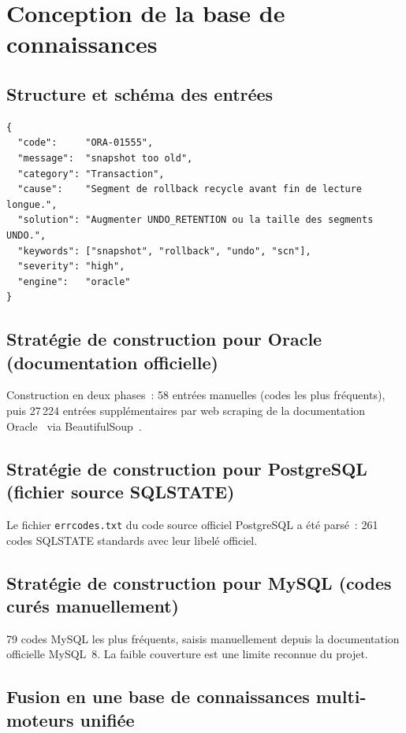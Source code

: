 \documentclass[12pt,a4paper]{report}
\begin{document}
\section{Conception de la base de connaissances}

\subsection{Structure et sch\'ema des entr\'ees}

\begin{lstlisting}[language={},caption={Sch\'ema d'une entr\'ee de la base de connaissances},label=lst:kb_schema]
{
  "code":     "ORA-01555",
  "message":  "snapshot too old",
  "category": "Transaction",
  "cause":    "Segment de rollback recycle avant fin de lecture longue.",
  "solution": "Augmenter UNDO_RETENTION ou la taille des segments UNDO.",
  "keywords": ["snapshot", "rollback", "undo", "scn"],
  "severity": "high",
  "engine":   "oracle"
}
\end{lstlisting}

\subsection{Strat\'egie de construction pour Oracle (documentation officielle)}

Construction en deux phases~: 58 entr\'ees manuelles (codes les plus fr\'equents),
puis 27\,224 entr\'ees suppl\'ementaires par web scraping de la documentation
Oracle~\cite{oracledoc} via BeautifulSoup~\cite{bs4}.

\subsection{Strat\'egie de construction pour PostgreSQL (fichier source SQLSTATE)}

Le fichier \texttt{errcodes.txt} du code source officiel PostgreSQL a \'et\'e
pars\'e~: 261 codes SQLSTATE standards avec leur libel\'e officiel.

\subsection{Strat\'egie de construction pour MySQL (codes cur\'es manuellement)}

79 codes MySQL les plus fr\'equents, saisis manuellement depuis la documentation
officielle MySQL~8. La faible couverture est une limite reconnue du projet.

\subsection{Fusion en une base de connaissances multi-moteurs unifi\'ee}
\end{document}
